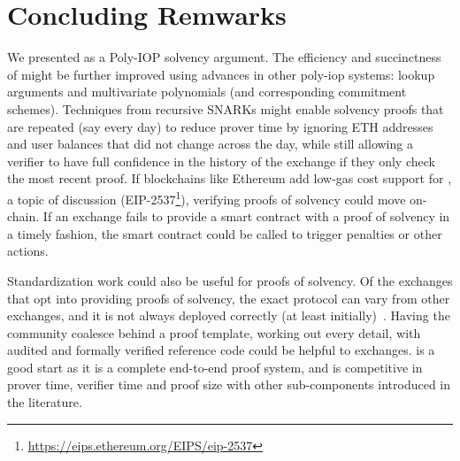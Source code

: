 \chapter{Concluding Remwarks}

We presented \Sys as a Poly-IOP solvency argument. The efficiency and succinctness of \Sys might be further improved using advances in other poly-iop systems: lookup arguments and multivariate polynomials (and corresponding commitment schemes). Techniques from recursive SNARKs might enable solvency proofs that are repeated (say every day) to reduce prover time by ignoring ETH addresses and user balances that did not change across the day, while still allowing a verifier to have full confidence in the history of the exchange if they only check the most recent proof. If blockchains like Ethereum add low-gas cost support for \bls, a topic of discussion (EIP-2537\footnote{\url{https://eips.ethereum.org/EIPS/eip-2537}}), verifying proofs of solvency could move on-chain. If an exchange fails to provide a smart contract with a proof of solvency in a timely fashion, the smart contract could be called to trigger penalties or other actions. 

Standardization work could also be useful for proofs of solvency. Of the exchanges that opt into providing proofs of solvency, the exact protocol can vary from other exchanges, and it is not always deployed correctly (at least initially)~\cite{broken}. Having the community coalesce behind a proof template, working out every detail, with audited and formally verified reference code could be helpful to exchanges. \Sys is a good start as it is a complete end-to-end proof system, and is competitive in prover time, verifier time and proof size with other sub-components introduced in the literature.
